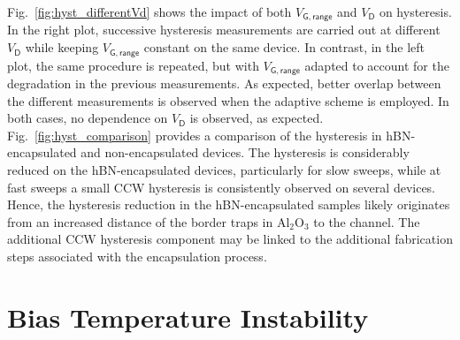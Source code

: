 \documentclass[conference]{IEEEtran}
\begin{document}
Fig.~\ref{fig:hyst_differentVd} shows the impact of both $V_\mathsf{G,range}$ and $V_\mathsf{D}$ on hysteresis. In the right plot, successive hysteresis measurements are carried out at different $V_\mathsf{D}$ while keeping $V_\mathsf{G,range}$ constant on the same device. In contrast, in the left plot, the same procedure is repeated, but with $V_\mathsf{G,range}$ adapted to account for the degradation in the previous measurements. As expected, better overlap between the different measurements is observed when the adaptive scheme is employed. In both cases, no dependence on $V_\mathsf{D}$ is observed, as expected. 
Fig.~\ref{fig:hyst_comparison} provides a comparison of the hysteresis in hBN-encapsulated and non-encapsulated devices. 
The hysteresis is considerably reduced on the hBN-encapsulated devices, particularly for slow sweeps, while at fast sweeps a small CCW hysteresis is consistently observed on several devices. Hence, the hysteresis reduction in the hBN-encapsulated samples likely originates from an increased distance of the border traps in Al$_2$O$_3$ to the channel.
The additional CCW hysteresis component may be linked to the additional fabrication steps associated with the encapsulation process.

\section{Bias Temperature Instability}\label{sec:BTI}
\end{document}
